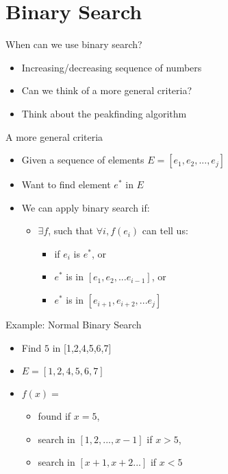 \documentclass[presentation]{beamer}
\begin{document}
\section{Binary Search}
\label{sec:org284fb4e}
\begin{frame}[<+->][label={sec:org3e6db2b}]{When can we use binary search?}
\begin{itemize}
\item Increasing/decreasing sequence of numbers
\item Can we think of a more general criteria?
\item Think about the peakfinding algorithm
\end{itemize}
\end{frame}
\begin{frame}[label={sec:orga8954f4}]{A more general criteria}
\begin{itemize}
\item Given a sequence of elements \(E = [e_{1}, e_{2}, ..., e_{j}]\)
\item Want to find element \(e^{*}\) in \(E\)
\item We can apply binary search if:
\begin{itemize}
\item \(\exists f\), such that \(\forall i, f(e_{i})\) can tell us:
\begin{itemize}
\item if \(e_{i}\) is \(e^{*}\), or
\item \(e^{*}\) is in \([e_{1}, e_{2}, ... e_{i - 1}]\), or
\item \(e^{*}\) is in \([e_{i+1}, e_{i+2}, ... e_{j}]\)
\end{itemize}
\end{itemize}
\end{itemize}
\end{frame}
\begin{frame}[label={sec:org0f5fa7f}]{Example: Normal Binary Search}
\begin{itemize}
\item Find \(5\) in [1,2,4,5,6,7]
\item \(E = [1,2,4,5,6,7]\)
\item \(f(x) =\)
\begin{itemize}
\item found if \(x = 5\),
\item search in \([1,2,...,x - 1]\) if \(x > 5\),
\item search in \([x + 1, x+2...]\) if \(x < 5\)
\end{itemize}
\end{itemize}
\end{frame}
\end{document}
